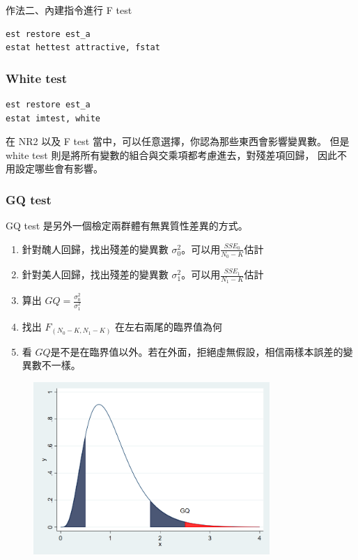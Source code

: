 \begin{frame}[fragile]
    作法二、內建指令進行 F test 
\begin{lstlisting}
est restore est_a
estat hettest attractive, fstat \end{lstlisting}

\end{frame}

\begin{frame}[fragile]
    \frametitle{White test}
\begin{lstlisting}
est restore est_a
estat imtest, white\end{lstlisting}
    

\vfill
在 NR2 以及 F test 當中，可以任意選擇，你認為那些東西會影響變異數。
但是 white test 則是將所有變數的組合與交乘項都考慮進去，對殘差項回歸，
因此不用設定哪些會有影響。
\end{frame}

\begin{frame}
    \frametitle{GQ test}

    GQ test 是另外一個檢定兩群體有無異質性差異的方式。
    \begin{enumerate}
        \item 針對醜人回歸，找出殘差的變異數 $\sigma_0^2$。可以用$\frac{SSE_0}{N_0-K}$估計
        \item 針對美人回歸，找出殘差的變異數 $\sigma_1^2$。可以用$\frac{SSE_1}{N_1-K}$估計
        \item 算出 $GQ = \frac{\sigma_0^2}{\sigma_1^2}$
        \item 找出 $F_{(N_0-K, N_1-K)}$ 在左右兩尾的臨界值為何
        \item 看 $GQ$是不是在臨界值以外。若在外面，拒絕虛無假設，相信兩樣本誤差的變異數不一樣。
    \end{enumerate}
    

\end{frame}
\begin{frame}
    \begin{figure}
        \includegraphics[width=0.8\textwidth]{../Results/F_demo.png}
    \end{figure}
    

\end{frame}

